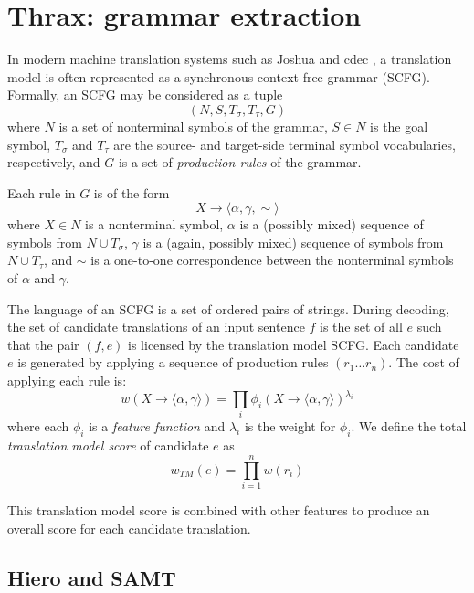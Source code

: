 \documentclass[11pt]{article}
\begin{document}
\section{Thrax: grammar extraction}

In modern machine translation systems such as Joshua \cite{Joshua-WMT} and cdec \cite{cdec}, a translation model is often represented as a synchronous context-free grammar (SCFG). Formally, an SCFG may be considered as a tuple
$$(N,S,T_\sigma,T_\tau,G)$$
where $N$ is a set of nonterminal symbols of the grammar, $S \in N$ is the goal symbol, $T_\sigma$ and $T_\tau$ are the source- and target-side terminal symbol vocabularies, respectively, and $G$ is a set of {\em production rules} of the grammar.

Each rule in $G$ is of the form
$$X \to \langle \alpha , \gamma , \sim \rangle$$
where $X \in N$ is a nonterminal symbol, $\alpha$ is a (possibly mixed) sequence of symbols from $N \cup T_\sigma$, $\gamma$ is a (again, possibly mixed) sequence of symbols from $N \cup T_\tau$, and $\sim$ is a one-to-one correspondence between the nonterminal symbols of $\alpha$ and $\gamma$.

The language of an SCFG is a set of ordered pairs of strings. During
decoding, the set of candidate translations of an input sentence $f$
is the set of all $e$ such that the pair $(f,e)$ is licensed by the
translation model SCFG.  Each candidate $e$ is generated by applying a
sequence of production rules $(r_1 \ldots r_n)$.  The cost of applying each rule is:
\begin{equation}
w(X \to \langle \alpha, \gamma \rangle) = \prod_i{\phi_i(X \to \langle \alpha , \gamma \rangle)^{\lambda_i}}
\end{equation}
where each $\phi_i$ is a {\em feature function} and $\lambda_i$ is the weight for $\phi_i$.
We define the total {\em translation model score} of candidate $e$ as
\begin{equation}
w_{TM}(e) = \prod_{i=1}^n{w(r_i)}
\end{equation}

\noindent This translation model score is combined with
other features to produce an overall score for each candidate translation.

\subsection{Hiero and SAMT}
\end{document}
